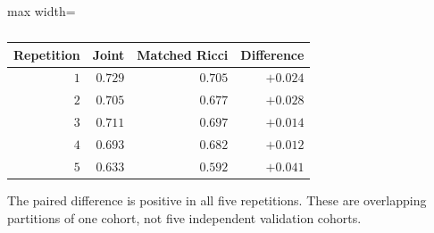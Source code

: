 \begin{table}[!htbp]
\centering\small
\caption{}
\label{tab:joint-v8-auc-repeats}
\begingroup\bfseries\boldmath
\begin{adjustbox}{max width=\linewidth}
\begin{tabular}{rrrr}
\toprule
Repetition & Joint & Matched Ricci & Difference \\
\midrule
$1$ & $0.729$ & $0.705$ & $+0.024$ \\
$2$ & $0.705$ & $0.677$ & $+0.028$ \\
$3$ & $0.711$ & $0.697$ & $+0.014$ \\
$4$ & $0.693$ & $0.682$ & $+0.012$ \\
$5$ & $0.633$ & $0.592$ & $+0.041$ \\
\bottomrule
\end{tabular}
\end{adjustbox}
\par\smallskip\begin{minipage}{0.98\linewidth}\footnotesize The paired difference is positive in all five repetitions. These are overlapping partitions of one cohort, not five independent validation cohorts.
\end{minipage}
\endgroup
\end{table}
